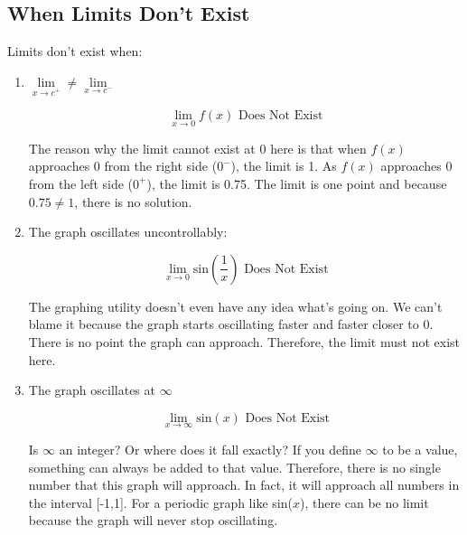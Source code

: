 \documentclass[../revisedMain.tex]{subfiles}
\begin{document}
\subsection{When Limits Don't Exist} Limits don't exist when:
\begin{enumerate}
\item $\lim\limits_{x\to c^+} \neq \lim\limits_{x\to c^-}$
\begin{center}
$$\lim_{x\to 0} f(x) \text{ Does Not Exist}$$
\end{center} 
\par The reason why the limit cannot exist at 0 here is that when $f(x)$ approaches 0 from the right side ($0^-$), the limit is 1. As $f(x)$ approaches 0 from the left side ($0^+$), the limit is 0.75. The limit is one point and because $0.75\neq 1$, there is no solution.
\newpage
\item The graph oscillates uncontrollably:
\begin{center}
$$\lim_{x\to 0} \text{sin} \left ( \frac{1}{x} \right ) \text{ Does Not Exist}$$
\end{center} \par The graphing utility doesn't even have any idea what's going on. We can't blame it because the graph starts oscillating faster and faster closer to 0. There is no point the graph can approach. Therefore, the limit must not exist here.
\newpage
\item The graph oscillates at $\infty$
\begin{center}
$$\lim_{x\to\infty} \text{sin}(x) \text{ Does Not Exist}$$
\end{center}
\par Is $\infty$ an integer? Or where does it fall exactly? If you define $\infty$ to be a value, something can always be added to that value. Therefore, there is no single number that this graph will approach. In fact, it will approach all numbers in the interval [-1,1]. For a periodic graph like sin($x$), there can be no limit because the graph will never stop oscillating.
\end{enumerate}
\end{document}
